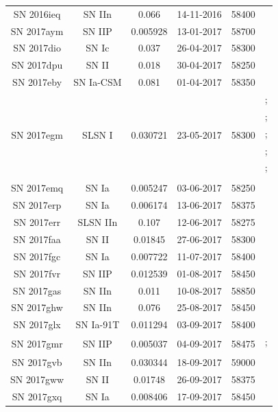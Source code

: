 \documentclass[a4paper,oneside,12pt, class=Latex/Classes/PhDthesisPSnPDF, crop=false]{standalone}
\begin{document}
\begin{longtable}{cccccc}
 SN 2016ieq & SN IIn & 0.066 & 14-11-2016 & 58400 & \\
 SN 2017aym & SN IIP & 0.005928 & 13-01-2017 & 58700 & \\
 SN 2017dio & SN Ic & 0.037 & 26-04-2017 & 58300 & \citet{2017dio, 2017dio_Shi}\\
 SN 2017dpu & SN II & 0.018 & 30-04-2017 & 58250 & \\
 SN 2017eby & SN Ia-CSM & 0.081 & 01-04-2017 & 58350 & \\
 \multirow{6}{*}{SN 2017egm} & \multirow{6}{*}{SLSN I} & \multirow{6}{*}{0.030721} & \multirow{6}{*}{23-05-2017} & \multirow{6}{*}{58300} & \citet{2017egm_Chen, 2017egm_Nicholl};\\
 &&&&&\citet{2017egm_Wheeler, 2017egm_Bose};\\
 &&&&&\citet{2017egm_Izzo, 2017egm_Maund};\\
 &&&&&\citet{2017egm_Hatsukade, 2017egm_Saito};\\
 &&&&&\citet{2017egm_Tsvetkov, 2017egm_Lin};\\
 &&&&&\citet{2017egm, 2017egm_Shang}\\
 SN 2017emq & SN Ia & 0.005247 & 03-06-2017 & 58250 & \\
 SN 2017erp & SN Ia & 0.006174 & 13-06-2017 & 58375 & \citet{2017erp}\\
 SN 2017err & SLSN IIn & 0.107 & 12-06-2017 & 58275 & \\
 SN 2017faa & SN II & 0.01845 & 27-06-2017 & 58300 & \\
 SN 2017fgc & SN Ia & 0.007722 & 11-07-2017 & 58400 & \citet{2017fgc_Burgaz, 2017fgc_Zeng}\\
 SN 2017fvr & SN IIP & 0.012539 & 01-08-2017 & 58450 & \\
 SN 2017gas & SN IIn & 0.011 & 10-08-2017 & 58850 & \\
 SN 2017ghw & SN IIn & 0.076 & 25-08-2017 & 58450 & \\
 SN 2017glx & SN Ia-91T & 0.011294 & 03-09-2017 & 58400 & \\
 \multirow{2}{*}{SN 2017gmr} & \multirow{2}{*}{SN IIP} & \multirow{2}{*}{0.005037} & \multirow{2}{*}{04-09-2017} & \multirow{2}{*}{58475} & \citet{2017gmr, 2017gmr_Nagao};\\
 &&&&&\citet{2017gmr_Utrobin}\\
 SN 2017gvb & SN IIn & 0.030344 & 18-09-2017 & 59000 & \\
 SN 2017gww & SN II & 0.01748 & 26-09-2017 & 58375 & \\
 SN 2017gxq & SN Ia & 0.008406 & 17-09-2017 & 58450 & \\

\end{longtable}
\end{document}
